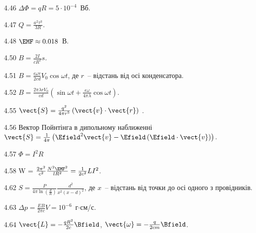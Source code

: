 \begin{Solution}{4.{46}}
    $\Delta\Phi = qR = 5\cdot10^{-4}$~Вб.
    
\end{Solution}
\begin{Solution}{4.{47}}
$Q = \frac{a^2\tau^3}{3R}$.
\end{Solution}
\begin{Solution}{4.{48}}
$\EMF \approx 0.018$~В.
\end{Solution}
\begin{Solution}{4.{50}}
	$B = \frac{2I}{cR^2}s$.
\end{Solution}
\begin{Solution}{4.{51}}
	$B = \frac{\epsilon\omega r}{2cd}V_0\cos\omega t$, де $r$~-- відстань від осі конденсатора.
\end{Solution}
\begin{Solution}{4.{52}}
	$B = \frac{2\pi\lambda r V_0}{cd}\left( \sin\omega t + \frac{\epsilon \omega}{4\pi\lambda}\cos\omega t\right) $.
\end{Solution}
\begin{Solution}{4.{55}}
	$\vect{S} = \frac{q^2}{4\pi r^5} \left( \vect{v} \cdot \vect{r}\right)$ .
\end{Solution}
\begin{Solution}{4.{56}}
	Вектор Пойнтінга в дипольному наближенні $\vect{S} = \frac{1}{4\pi} \left( \Efield^2 \vect{v} - \Efield\left(\Efield\cdot\vect{v} \right) \right) $.
\end{Solution}
\begin{Solution}{4.{57}}
	$\Phi = I^2R$
\end{Solution}
\begin{Solution}{4.{58}}
	W = $\frac{2\pi^2}{c^2} \frac{N^2\EMF^2}{lR^2} = \frac{1}{2c^2} LI^2$.
\end{Solution}
\begin{Solution}{4.{62}}
	$S  = \frac{P}{4\pi\ln\left( \frac{d}{R} \right) } \frac{d^2}{x^2\left( x - d\right)^2 }$, де $x$~-- відстань від точки до осі одного з провідників.
\end{Solution}
\begin{Solution}{4.{63}}
	$\Delta p = \frac{EB}{2\pi c}V = 10^{-6}$~г$\cdot$см/с.
\end{Solution}
\begin{Solution}{4.{64}}
    $ \vect{L} =  -\frac{q R^2}{2c}\Bfield $, $ \vect{\omega} = -\frac{q}{2c m}\Bfield $.
\end{Solution}

